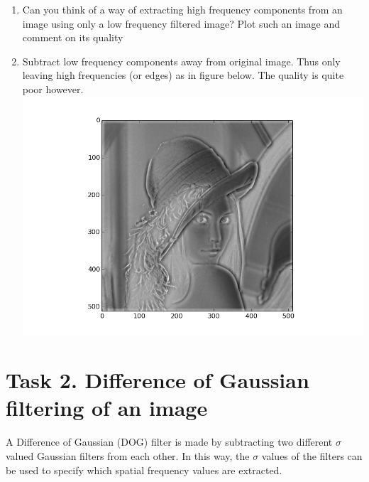 \documentclass[12pt,english]{scrartcl}
\begin{document}
\begin{enumerate}
 \color{black}
 \item Can you think of a way of extracting high frequency components from an image using only a low frequency filtered image? Plot such an image and comment on its quality \\
 \item[]
 \color{blue}
 Subtract low frequency components away from original image. Thus only leaving high frequencies (or edges) as in figure below. The quality is quite poor however. \\
 \centering
 \includegraphics[scale=0.3]{../Figures/Edge_detection/Answer_T1_3.png} 
 
 \end{enumerate}


\section*{Task 2. Difference of Gaussian filtering of an image}
A Difference of Gaussian (DOG) filter is made by subtracting two different $\sigma$ valued Gaussian filters from each other. In this way, the $\sigma$ values of the filters can be used to specify which spatial frequency values are extracted.
\end{document}
